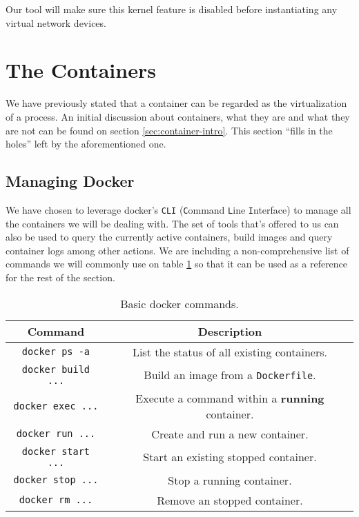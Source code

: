         Our tool will make sure this kernel feature is disabled before instantiating any virtual network devices.

    \section{The Containers} \label{sec:container-techy}
        We have previously stated that a container can be regarded as the virtualization of a process. An initial discussion about containers, what they are and what they are not can be found on section \ref{sec:container-intro}. This section ``fills in the holes'' left by the aforementioned one.

        \subsection{Managing Docker}
            We have chosen to leverage docker's \texttt{CLI} (\texttt{C}ommand \texttt{L}ine \texttt{I}nterface) to manage all the containers we will be dealing with. The set of tools that's offered to us can also be used to query the currently active containers, build images and query container logs among other actions. We are including a non-comprehensive list of commands we will commonly use on table \ref{tab:docker-commands} so that it can be used as a reference for the rest of the section.

            \begin{table}
                \centering
                \begin{tabular}{|c|c|}
                    \hline
                    \textbf{Command} & \textbf{Description}\\
                    \hline
                    \texttt{docker ps -a} & List the status of all existing containers.\\
                    \hline
                    \texttt{docker build ...} & Build an image from a \texttt{Dockerfile}.\\
                    \hline
                    \texttt{docker exec ...} & Execute a command within a \textbf{running} container.\\
                    \hline
                    \texttt{docker run ...} & Create and run a new container.\\
                    \hline
                    \texttt{docker start ...} & Start an existing stopped container.\\
                    \hline
                    \texttt{docker stop ...} & Stop a running container.\\
                    \hline
                    \texttt{docker rm ...} & Remove an stopped container.\\
                    \hline
                \end{tabular}
                \caption{Basic docker commands.}
                \label{tab:docker-commands}
            \end{table}

